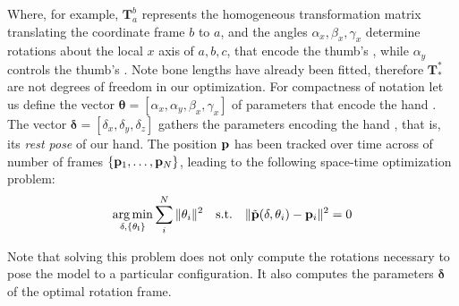 
Where, for example, $\mathbf{T}_a^b$ represents the homogeneous transformation matrix translating the coordinate frame $b$ to $a$, and the angles $\alpha_x, \beta_x, \gamma_x$ determine rotations about the local $x$ axis of $a, b, c$, that encode the thumb's , while $\alpha_y$ controls the thumb's . Note bone lengths have already been fitted, therefore $\mathbf{T}_*^*$ are not degrees of freedom in our optimization. For compactness of notation let us define the vector $\mathbf{\theta} = [\alpha_x, \alpha_y, \beta_x, \gamma_x ]$ of parameters that encode the hand . The vector $\mathbf{\delta} = [\delta_x, \delta_y, \delta_z]$ gathers the parameters encoding the hand , that is, its \emph{rest pose} of our hand. 
The position $\mathbf{p}$ has been tracked over time across of number of frames $\{\mathbf{p}_1, \dots, \mathbf{p}_N\}$, leading to the following space-time optimization problem:
% 
\begin{eqnarray}
\operatorname*{arg\,min}_{\mathbf{\delta}, \{\mathbf{\theta_i}\}} \sum_i^N \| \mathbf{\theta}_i \|^2 \quad \text{s.t.} \quad \| \tilde{\mathbf{p}}(\mathbf{\delta}, \mathbf{\theta}_i) - \mathbf{p}_i \|^2 = 0
\label{eq:kinopt}    
\end{eqnarray}


Note that solving this problem does not only compute the rotations necessary to pose the model to a particular configuration. It also computes the parameters $\mathbf{\delta}$ of the optimal rotation frame. 

\ATFINISH

\newpage
{}

